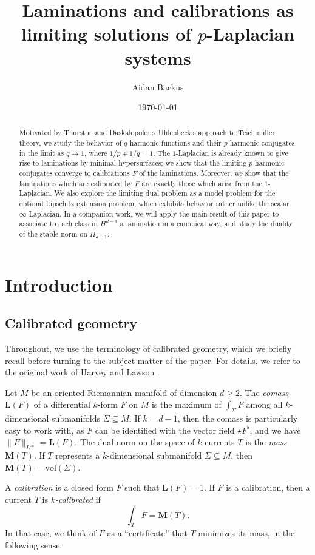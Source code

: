 \documentclass[reqno,11pt]{amsart}
\title{Laminations and calibrations as limiting solutions of $p$-Laplacian systems}
\author{Aidan Backus}
\date{\today}
\newcommand{\vol}{\mathrm{vol}}
\newcommand{\Mass}{\mathbf M}
\newcommand{\Comass}{\mathbf L}
\newcommand{\dfn}[1]{\emph{#1}\index{#1}}
\theoremstyle{definition}
\numberwithin{equation}{section}
\begin{document}
\begin{abstract}
Motivated by Thurston and Daskalopolous--Uhlenbeck's approach to Teichm\"uller theory, we study the behavior of $q$-harmonic functions and their $p$-harmonic conjugates in the limit as $q \to 1$, where $1/p + 1/q = 1$.
The $1$-Laplacian is already known to give rise to laminations by minimal hypersurfaces; we show that the limiting $p$-harmonic conjugates converge to calibrations $F$ of the laminations.
Moreover, we show that the laminations which are calibrated by $F$ are exactly those which arise from the $1$-Laplacian.
We also explore the limiting dual problem as a model problem for the optimal Lipschitz extension problem, which exhibits behavior rather unlike the scalar $\infty$-Laplacian.
In a companion work, we will apply the main result of this paper to associate to each class in $H^{d - 1}$ a lamination in a canonical way, and study the duality of the stable norm on $H_{d - 1}$.
\end{abstract}

\maketitle

\section{Introduction}
\subsection{Calibrated geometry}
Throughout, we use the terminology of calibrated geometry, which we briefly recall before turning to the subject matter of the paper.
For details, we refer to the original work of Harvey and Lawson \cite{Harvey82}.

Let $M$ be an oriented Riemannian manifold of dimension $d \geq 2$.
The \dfn{comass} $\Comass(F)$ of a differential $k$-form $F$ on $M$ is the maximum of $\int_\Sigma F$ among all $k$-dimensional submanifolds $\Sigma \subseteq M$.
If $k = d - 1$, then the comass is particularly easy to work with, as $F$ can be identified with the vector field $\star F^\flat$, and we have $\|F\|_{L^\infty} = \Comass(F)$.
The dual norm on the space of $k$-currents $T$ is the \dfn{mass} $\Mass(T)$.
If $T$ represents a $k$-dimensional submanifold $\Sigma \subseteq M$, then $\Mass(T) = \vol(\Sigma)$.

A \dfn{calibration} is a closed form $F$ such that $\Comass(F) = 1$.
If $F$ is a calibration, then a current $T$ is \dfn{$k$-calibrated} if
$$\int_T F = \Mass(T).$$
In that case, we think of $F$ as a ``certificate'' that $T$ minimizes its mass, in the following sense:
\end{document}
